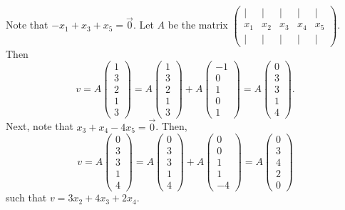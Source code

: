 \documentclass[11pt]{article}
\begin{document}
\begin{enumerate}[1)]
\begin{solution}
Note that $-x_1 + x_3 + x_5 = \vec{0}$. 
Let $A$ be the matrix $\begin{pmatrix} | &| & | & | & | \\x_1 & x_2 & x_3 &x_4 &x_5 \\ | &| & | & | & | \end{pmatrix}$. Then $$v = A \begin{pmatrix} 1\\3\\2\\1\\3\end{pmatrix} = A \begin{pmatrix} 1\\3\\2\\1\\3\end{pmatrix} + A \begin{pmatrix} -1\\0\\1\\0\\1\end{pmatrix} = A \begin{pmatrix} 0\\3\\3\\1\\4\end{pmatrix}.$$
Next, note that $x_3 + x_4 -4x_5 = \vec{0}$. Then, 
$$v = A \begin{pmatrix} 0\\3\\3\\1\\4\end{pmatrix} = A \begin{pmatrix} 0\\3\\3\\1\\4\end{pmatrix} + A \begin{pmatrix} 0\\0\\1\\1\\-4\end{pmatrix} = A \begin{pmatrix} 0\\3\\4\\2\\0\end{pmatrix}$$
such that $v = 3x_2 + 4x_3 + 2x_4.$
\end{solution}


\end{enumerate}
\end{document}

